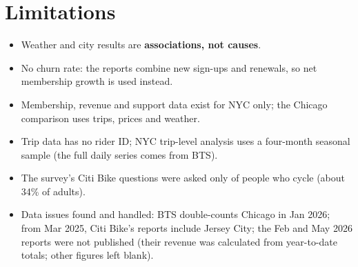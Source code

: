 \documentclass[11pt,a4paper]{article}
\begin{document}
\section{Limitations}
\begin{itemize}
\item Weather and city results are \textbf{associations, not causes}.
\item No churn rate: the reports combine new sign-ups and renewals, so net membership growth is used instead.
\item Membership, revenue and support data exist for NYC only; the Chicago comparison uses trips, prices and weather.
\item Trip data has no rider ID; NYC trip-level analysis uses a four-month seasonal sample (the full daily series comes from BTS).
\item The survey's Citi Bike questions were asked only of people who cycle (about 34\% of adults).
\item Data issues found and handled: BTS double-counts Chicago in Jan 2026; from Mar 2025, Citi Bike's reports include Jersey City; the Feb and May 2026 reports were not published (their revenue was calculated from year-to-date totals; other figures left blank).
\end{itemize}
\end{document}
